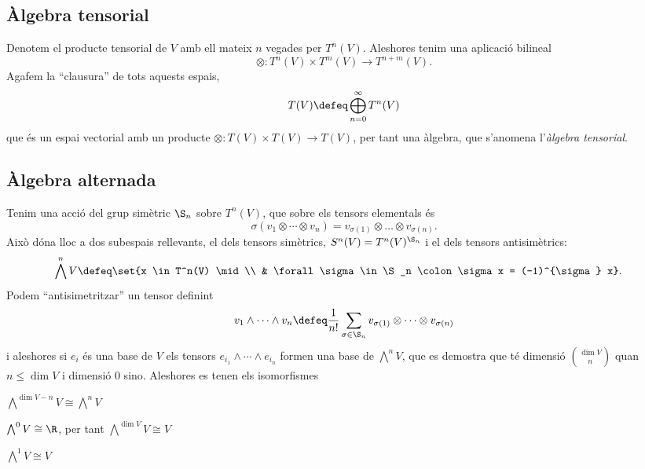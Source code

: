 \documentclass[12pt,twocolumn]{article}
\begin{document}
\subsection{Àlgebra tensorial}
Denotem el producte tensorial de \( V \) amb ell mateix \( n \) vegades per \( T^n(V) \).
Aleshores tenim una aplicació bilineal
\begin{equation*}
	\otimes \colon T^n(V) \times T^m(V) \to T^{n+m}(V).
\end{equation*}
Agafem la ``clausura'' de tots aquests espais,
\begin{equation*}
	T(V) \defeq \bigoplus_{n = 0}^\infty T^n(V)
\end{equation*}
que és un espai vectorial amb un producte \( \otimes \colon T(V) \times T(V) \to T(V) \), per
tant una àlgebra, que s'anomena l'\emph{àlgebra tensorial}. 

\subsection{Àlgebra alternada}
Tenim una acció del grup simètric \( \S_n \) sobre \( T^n(V) \), que sobre els tensors
elementals és
\begin{equation*}
	\sigma(v_1 \otimes \cdots \otimes v_n) = v_{\sigma(1)} \otimes \dots \otimes
	v_{\sigma(n)}. 
\end{equation*}
Això dóna lloc a dos subespais rellevants, el dels tensors simètrics, \( S^n(V) =
T^n(V)^{\S_n} \) i el dels tensors antisimètrics:
\begin{align*}
	\bigwedge^n V & \defeq \set{x \in T^n(V) \mid \\
						 & \forall \sigma \in \S_n \colon \sigma x =
	(-1)^{\sigma} x}. 
\end{align*}
Podem ``antisimetritzar'' un tensor definint
\begin{equation*}
	v_1 \wedge \cdots \wedge v_n \defeq \frac{1}{n!} \sum_{\sigma \in \S_n} v_{\sigma(1)}
	\otimes \cdots \otimes v_{\sigma(n)}
\end{equation*}
i aleshores si \( e_i \) és una base de \( V \) els tensors \( e_{i_1} \wedge \cdots \wedge
e_{i_n} \) formen una base de \( \bigwedge^nV \), que es demostra que té dimensió \( \binom{\dim
V}{n} \) quan \( n \leq \dim V \) i dimensió 0 sino. Aleshores es tenen els isomorfismes
\begin{points}
\item \( \bigwedge^{\dim V - n}V \cong \bigwedge^n V\)
\item \( \bigwedge^0 V \cong \R \), per tant \( \bigwedge^{\dim V} V \cong V \)
\item \( \bigwedge^{1} V \cong V \)
\end{points}
\end{document}
